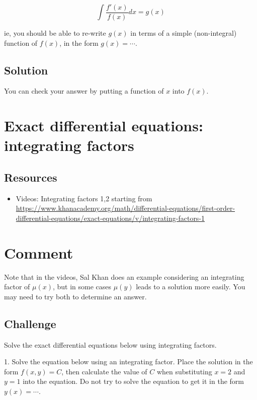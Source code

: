 \begin{equation}
    \int \frac{f'(x)}{f(x)} dx = g(x)
\end{equation}

ie, you should be able to re-write $g(x)$ in terms of a simple (non-integral) function of $f(x)$, in the form $g(x) = \cdots$.

\subsection*{Solution}
You can check your answer by putting a function of $x$ into $f(x)$.

\timebox




\newpage
\section{Exact differential equations: integrating factors}
\label{sec:edeif}

\subsection*{Resources}
\begin{itemize}
    \item Videos: Integrating factors 1,2 starting from \url{https://www.khanacademy.org/math/differential-equations/first-order-differential-equations/exact-equations/v/integrating-factors-1}
\end{itemize}

\section*{Comment}
Note that in the videos, Sal Khan does an example considering an integrating factor of $\mu(x)$, but in some cases $\mu(y)$ leads to a solution more easily. You may need to try both to determine an answer.

\subsection*{Challenge}
Solve the exact differential equations below using integrating factors.

1. Solve the equation below using an integrating factor. Place the solution in the form $f(x,y) = C$, then calculate the value of $C$ when substituting $x=2$ and $y=1$ into the equation. Do not try to solve the equation to get it in the form $y(x)=\cdots$.

